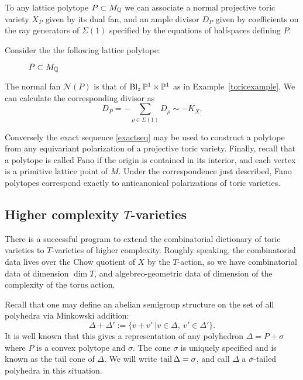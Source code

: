To any lattice polytope \(P \subset M_{\mathbb{Q}}\) we can associate a normal projective toric variety \(X_P\) given by its dual fan, and an ample divisor \(D_P\) given by coefficients on the ray generators of \(\Sigma(1)\) specified by the equations of halfspaces defining \(P\).
\begin{example} \label{ex:toricpolytope}
Consider the the following lattice polytope:
\begin{figure}[h]
\centering
	\caption{$P \subset M_{\mathbb{Q}}$}
\end{figure}
The normal fan \(\mathcal{N}(P)\) is that of \(\operatorname{Bl}_z \mathbb{P}^1 \times \mathbb{P}^1\) as in Example~\ref{toricexample}. We can calculate the corresponding divisor as
\[
D_P = - \sum_{\rho \in \Sigma(1)} D_\rho \sim -K_X.
\]
\end{example}
Conversely the exact sequence \ref{exactseq} may be used to construct a polytope from any equivariant polarization of a projective toric variety. Finally, recall that a polytope is called Fano if the origin is contained in its interior, and each vertex is a primitive lattice point of \(M\). Under the correspondence just described, Fano polytopes correspond exactly to anticanonical polarizations of toric varieties.
\subsection{Higher complexity $T$-varieties}
There is a successful program to extend the combinatorial dictionary of toric varieties to \(T\)-varieties of higher complexity. Roughly speaking, the combinatorial data lives over the Chow quotient of \(X\) by the \(T\)-action, so we have combinatorial data of dimension \(\dim T\), and algebreo-geometric data of dimension of the complexity of the torus action.

Recall that one may define an abelian semigroup structure on the set of all polyhedra via Minkowski addition:
\[
\Delta + \Delta' := \{ v + v' \ | v \in \Delta, \ v' \in \Delta' \}.
\]
It is well known that this gives a representation of any polyhedron \(\Delta = P + \sigma \) where \(P\) is a convex polytope and \(\sigma\). The cone \(\sigma\) is uniquely specified and is known as the tail cone of \(\Delta\). We will write \(\operatorname{tail} \Delta = \sigma\), and call \(\Delta\) a \(\sigma\)-tailed polyhedra in this situation.

